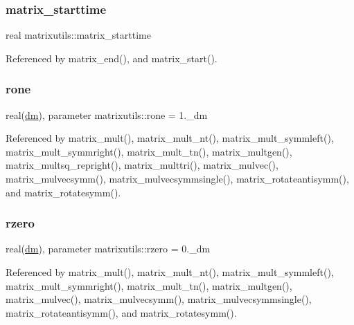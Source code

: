 \subsubsection{\texorpdfstring{matrix\+\_\+starttime}{matrix\_starttime}}
{\footnotesize\ttfamily real matrixutils\+::matrix\+\_\+starttime}



Referenced by matrix\+\_\+end(), and matrix\+\_\+start().

\mbox{\label{namespacematrixutils_ad1137ea4186d00583875a1e7e08a721f}} 
\subsubsection{\texorpdfstring{rone}{rone}}
{\footnotesize\ttfamily real(\mbox{\hyperlink{namespacematrixutils_a7bdc564986ea4d90f51201c75606ef3d}{dm}}), parameter matrixutils\+::rone = 1.\+\_\+dm}



Referenced by matrix\+\_\+mult(), matrix\+\_\+mult\+\_\+nt(), matrix\+\_\+mult\+\_\+symmleft(), matrix\+\_\+mult\+\_\+symmright(), matrix\+\_\+mult\+\_\+tn(), matrix\+\_\+multgen(), matrix\+\_\+multsq\+\_\+repright(), matrix\+\_\+multtri(), matrix\+\_\+mulvec(), matrix\+\_\+mulvecsymm(), matrix\+\_\+mulvecsymmsingle(), matrix\+\_\+rotateantisymm(), and matrix\+\_\+rotatesymm().

\mbox{\label{namespacematrixutils_a0047cc2c6d161d05f23b748bb5b9a70a}} 
\subsubsection{\texorpdfstring{rzero}{rzero}}
{\footnotesize\ttfamily real(\mbox{\hyperlink{namespacematrixutils_a7bdc564986ea4d90f51201c75606ef3d}{dm}}), parameter matrixutils\+::rzero = 0.\+\_\+dm}



Referenced by matrix\+\_\+mult(), matrix\+\_\+mult\+\_\+nt(), matrix\+\_\+mult\+\_\+symmleft(), matrix\+\_\+mult\+\_\+symmright(), matrix\+\_\+mult\+\_\+tn(), matrix\+\_\+multgen(), matrix\+\_\+mulvec(), matrix\+\_\+mulvecsymm(), matrix\+\_\+mulvecsymmsingle(), matrix\+\_\+rotateantisymm(), and matrix\+\_\+rotatesymm().

